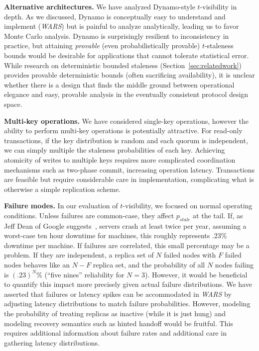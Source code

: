 \documentclass{vldb}
\begin{document}
\textbf{Alternative architectures.} We have analyzed Dynamo-style
$t$-visibility in depth.  As we discussed, Dynamo is conceptually easy
to understand and implement (\textit{WARS}) but is painful to analyze
analytically, leading us to favor Monte Carlo analysis.  Dynamo is
surprisingly resilient to inconsistency in practice, but attaining
\textit{provable} (even probabilistically provable) $t$-staleness
bounds would be desirable for applications that cannot tolerate
statistical error.  While research on deterministic bounded staleness
(Section~\ref{sec:relatedwork}) provides provable deterministic bounds
(often sacrificing availability), it is unclear whether there is a
design that finds the middle ground between operational elegance and
easy, provable analysis in the eventually consistent protocol design
space.

\textbf{Multi-key operations.} We have considered single-key
operations, however the ability to perform multi-key operations is
potentially attractive.  For read-only transactions, if the key
distribution is random and each quorum is independent, we can simply
multiple the staleness probabilities of each key.  Achieving atomicity
of writes to multiple keys requires more complicated coordination
mechanisms such as two-phase commit, increasing operation latency.
Transactions are feasible but require considerable care in
implementation, complicating what is otherwise a simple replication
scheme.

\textbf{Failure modes.} In our evaluation of $t$-visibility, we
focused on normal operating conditions. Unless failures are
common-case, they affect $p_{stale}$ at the tail.  If, as Jeff Dean of
Google suggests~\cite{dean-keynote}, servers crash at least twice per
year, assuming a worst-case ten hour downtime for machines, this
roughly represents .23\% downtime per machine.  If failures are
correlated, this small percentage may be a problem.  If they are
independent, a replica set of $N$ failed nodes with $F$ failed nodes
behaves like an $N-F$ replica set, and the probability of all $N$
nodes failing is $(.23)^N$\% (``five nines'' reliability for
$N$$=$$3$).  However, it would be beneficial to quantify this impact
more precisely given actual failure distributions.  We have asserted
that failures or latency spikes can be accommodated in \textit{WARS}
by adjusting latency distributions to match failure probabilities.
However, modeling the probability of treating replicas as inactive
(while it is just hung) and modeling recovery semantics such as hinted
handoff would be fruitful.  This requires additional information about
failure rates and additional care in gathering latency distributions.
\end{document}
